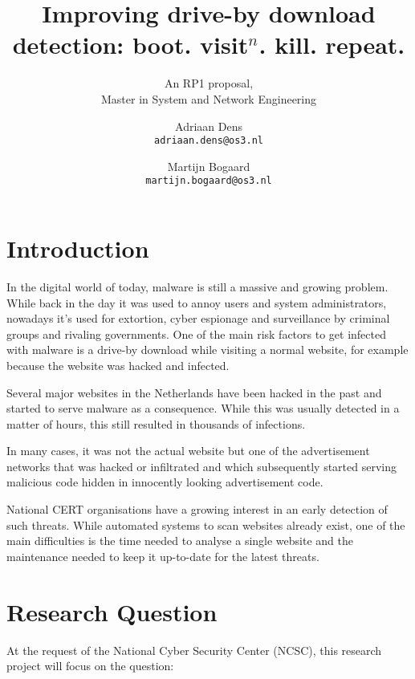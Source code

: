 \documentclass{scrartcl}
\title{Improving drive-by download detection: boot. visit$^n$. kill. repeat.}
\subtitle{An RP1 proposal,\\Master in System and Network Engineering}
\author{
  Adriaan Dens\\
   \texttt{adriaan.dens@os3.nl}
  \and
  Martijn Bogaard\\
   \texttt{martijn.bogaard@os3.nl}
}
\begin{document}
\maketitle

\section{Introduction}

In the digital world of today, malware is still a massive and growing problem. While back in the day it was used to annoy users and system administrators, nowadays it's used for extortion, cyber espionage and surveillance by criminal groups and rivaling governments. One of the main risk factors to get infected with malware is a drive-by download while visiting a normal website, for example because the website was hacked and infected. 

Several major websites in the Netherlands have been hacked in the past and started to serve malware as a consequence. While this was usually detected in a matter of hours, this still resulted in thousands of infections.

In many cases, it was not the actual website but one of the advertisement networks that was hacked or infiltrated and which subsequently started serving malicious code hidden in innocently looking advertisement code.


National CERT organisations have a growing interest in an early detection of such threats. While automated systems to scan websites already exist, one of the main difficulties is the time needed to analyse a single website and the maintenance needed to keep it up-to-date for the latest threats.

\section{Research Question}
At the request of the National Cyber Security Center (NCSC), this research project will focus on the question:\\ %
\end{document}
